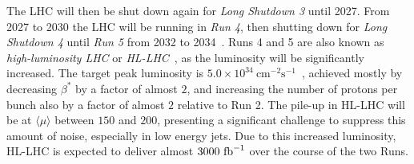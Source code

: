 The LHC will then be shut down again for \textit{Long Shutdown 3} until 2027.
From 2027 to 2030 the LHC will be running in \textit{Run 4}, then shutting down for \textit{Long Shutdown 4} until \textit{Run 5} from 2032 to 2034~\cite{lhc-commissioning}.
Runs 4 and 5 are also known as \textit{high-luminosity LHC} or \textit{HL-LHC}~\cite{hl-lhc}, as the luminosity will be significantly increased.
The target peak luminosity is $5.0\times10^{34}~\text{cm}^{-2}\text{s}^{-1}$~\cite{Boyd:2020qox}, achieved mostly by decreasing $\beta^*$ by a factor of almost $2$, and increasing the number of protons per bunch also by a factor of almost $2$ relative to Run 2.
The pile-up in HL-LHC will be at $\langle \mu \rangle$ between $150$ and $200$, presenting a significant challenge to suppress this amount of noise, especially in low energy jets.
Due to this increased luminosity, HL-LHC is expected to deliver almost $3000~\mathrm{fb}^{-1}$ over the course of the two Runs.


